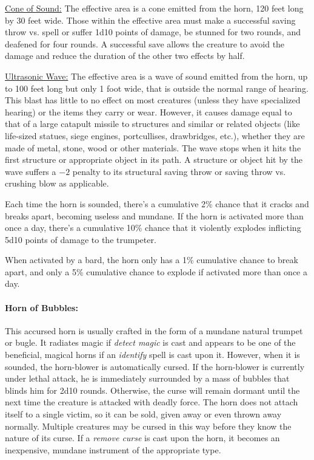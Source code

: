 \begin{multicols}{2}
\underline{Cone of Sound:} The effective area is a cone emitted from the horn, 120 feet long by 30 feet wide.  Those within the effective area must make a successful saving throw vs. spell or suffer 1d10 points of damage, be stunned for two rounds, and deafened for four rounds.  A successful save allows the creature to avoid the damage and reduce the duration of the other two effects by half. 

\underline{Ultrasonic Wave:} The effective area is a wave of sound emitted from the horn, up to 100 feet long but only 1 foot wide, that is outside the normal range of hearing.  This blast has little to no effect on most creatures (unless they have specialized hearing) or the items they carry or wear.  However, it causes damage equal to that of a large catapult missile to structures and similar or related objects (like life-sized statues, siege engines, portcullises, drawbridges, etc.), whether they are made of metal, stone, wood or other materials.  The wave stops when it hits the first structure or appropriate object in its path.  A structure or object hit by the wave suffers a $-2$ penalty to its structural saving throw or saving throw vs. crushing blow as applicable.

Each time the horn is sounded, there's a cumulative 2\% chance that it cracks and breaks apart, becoming useless and mundane.  If the horn is activated more than once a day, there's a cumulative 10\% chance that it violently explodes inflicting 5d10 points of damage to the trumpeter.

When activated by a bard, the horn only has a 1\% cumulative chance to break apart, and only a 5\% cumulative chance to explode if activated more than once a day.

\paragraph{Horn of Bubbles:} This accursed horn is usually crafted in the form of a mundane natural trumpet or bugle.  It radiates magic if \textit{detect magic} is cast and appears to be one of the beneficial, magical horns if an \textit{identify} spell is cast upon it.  However, when it is sounded, the horn-blower is automatically cursed.  If the horn-blower is currently under lethal attack, he is immediately surrounded by a mass of bubbles that blinds him for 2d10 rounds.  Otherwise, the curse will remain dormant until the next time the creature is attacked with deadly force.  The horn does not attach itself to a single victim, so it can be sold, given away or even thrown away normally.  Multiple creatures may be cursed in this way before they know the nature of its curse.  If a \textit{remove curse} is cast upon the horn, it becomes an inexpensive, mundane instrument of the appropriate type.


\end{multicols}
